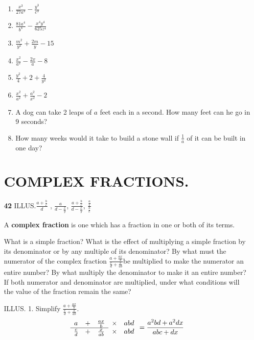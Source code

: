 \documentclass{book}
\begin{document}
\begin{enumerate}
\item $\displaystyle \frac{x^3}{27a^3} - \frac{y^3}{c^3}$

\item $\displaystyle \frac{81a^4}{b^4} - \frac{x^4y^4}{625z^4}$

\item $\displaystyle \frac{m^2}{y^2} + \frac{2m}{y} - 15$

\item $\displaystyle \frac{x^2}{a^2} - \frac{2x}{a} - 8$

\item $\displaystyle \frac{y^2}{4} + 2 + \frac{4}{y^2}$

\item $\displaystyle \frac{x^2}{a^2} + \frac{a^2}{x^2} - 2$

\item A dog can take 2 leaps of $a$ feet each in a second. How
many feet can he go in 9 seconds?

\item How many weeks would it take to build a stone wall if
$\frac{1}{a}$ of it can be built in one day?
\end{enumerate}

\section*{COMPLEX FRACTIONS.}

\textbf{ 42} ILLUS.$ \displaystyle \frac{a + \frac{b}{c}}{d}$ ,
$\displaystyle \frac{a}{d - \frac{x}{y}}$, $\displaystyle \frac{a
+ \frac{b}{c}}{d - \frac{x}{y}}$, $\displaystyle
\frac{\frac{a}{x}}{\frac{b}{c}}$

A \textbf{ complex fraction} is one which has a fraction in one or
both of its terms.

What is a simple fraction? What is the effect of multiplying a
simple fraction by its denominator or by any multiple of its
denominator? By what must the numerator of the complex fraction
$\displaystyle \frac{ a + \frac{ax}{b} }{ \frac{c}{d} +
\frac{x}{ab} } $be multiplied to make the numerator an entire
number? By what multiply the denominator to make it an entire
number? If both numerator and denominator are multiplied, under
what conditions will the value of the fraction remain the same?

ILLUS. 1. Simplify $\displaystyle \frac{ a + \frac{ax}{b} }{
\frac{c}{d} + \frac{x}{ab} }$.
\[
\begin{array}{ccccc}
   a           &+& \frac{ax}{b} & \times & abd   \\
   \cline{1-3}
   \frac{c}{d} &+& \frac{x}{ab} & \times & abd
\end{array}
           = \frac{ a^2bd + a^2dx }{ abc + dx }
\]
\end{document}
